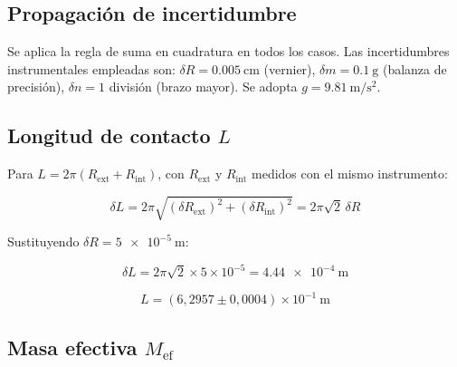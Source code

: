 
\begin{appendices}

\section{Propagación de incertidumbre}
\label{anx:prop_incertidumbre}

Se aplica la regla de suma en cuadratura en todos los casos. Las
incertidumbres instrumentales empleadas son:
$\delta R = \qty{0,005}{\centi\meter}$ (vernier),
$\delta m = \qty{0,1}{\gram}$ (balanza de precisión),
$\delta n = 1$ división (brazo mayor).
Se adopta $g = \qty{9,81}{\meter\per\second\squared}$.

\subsection{Longitud de contacto \texorpdfstring{$L$}{L}}


Para $L = 2\pi(R_{\text{ext}} + R_{\text{int}})$, con $R_{\text{ext}}$
y $R_{\text{int}}$ medidos con el mismo instrumento:

\begin{equation}
    \delta L = 2\pi\sqrt{(\delta R_{\text{ext}})^2 + (\delta R_{\text{int}})^2}
             = 2\pi\sqrt{2}\,\delta R
\end{equation}

Sustituyendo $\delta R = \qty{5e-5}{\meter}$:

\begin{equation*}
    \delta L = 2\pi\sqrt{2} \times 5\times10^{-5}
             = \qty{4,44e-4}{\meter}
\end{equation*}

\begin{equation*}
    \boxed{L = (6{,}2957 \pm 0{,}0004) \times 10^{-1}\ \si{\meter}}
\end{equation*}

\subsection{Masa efectiva \texorpdfstring{$M_{\text{ef}}$}{Mef}}


\end{appendices}
